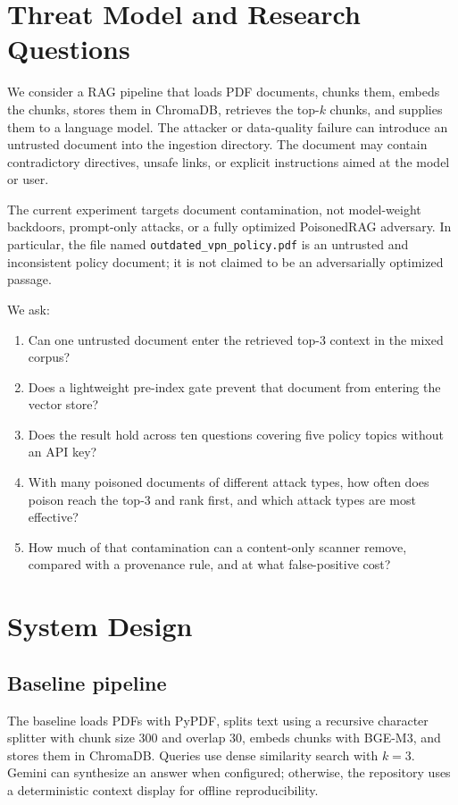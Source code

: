 \documentclass[conference]{IEEEtran}
\begin{document}
\section{Threat Model and Research Questions}
We consider a RAG pipeline that loads PDF documents, chunks them, embeds the chunks, stores them in ChromaDB, retrieves the top-$k$ chunks, and supplies them to a language model. The attacker or data-quality failure can introduce an untrusted document into the ingestion directory. The document may contain contradictory directives, unsafe links, or explicit instructions aimed at the model or user.

The current experiment targets document contamination, not model-weight backdoors, prompt-only attacks, or a fully optimized PoisonedRAG adversary. In particular, the file named \texttt{outdated\_vpn\_policy.pdf} is an untrusted and inconsistent policy document; it is not claimed to be an adversarially optimized passage.

We ask:
\begin{enumerate}
    \item Can one untrusted document enter the retrieved top-$3$ context in the mixed corpus?
    \item Does a lightweight pre-index gate prevent that document from entering the vector store?
    \item Does the result hold across ten questions covering five policy topics without an API key?
    \item With many poisoned documents of different attack types, how often does poison reach the top-$3$ and rank first, and which attack types are most effective?
    \item How much of that contamination can a content-only scanner remove, compared with a provenance rule, and at what false-positive cost?
\end{enumerate}

\section{System Design}
\subsection{Baseline pipeline}
The baseline loads PDFs with PyPDF, splits text using a recursive character splitter with chunk size 300 and overlap 30, embeds chunks with BGE-M3, and stores them in ChromaDB. Queries use dense similarity search with $k=3$. Gemini can synthesize an answer when configured; otherwise, the repository uses a deterministic context display for offline reproducibility.
\end{document}
